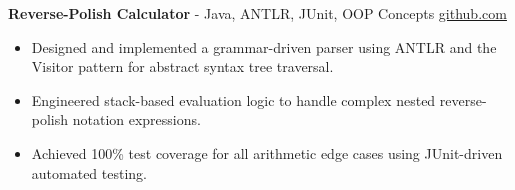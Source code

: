 \documentclass[11pt]{article}       %
\begin{document}
\textbf{Reverse-Polish Calculator}{ - Java, ANTLR, JUnit, OOP Concepts} \hfill \href{https://github.com/Monica20030707/ANTLR_ReversePolishCalculator}{github.com} \\
\vspace{-9pt}
\begin{itemize}
  \item Designed and implemented a grammar-driven parser using ANTLR and the Visitor pattern for abstract syntax tree traversal.
  \item Engineered stack-based evaluation logic to handle complex nested reverse-polish notation expressions.
  \item Achieved 100\% test coverage for all arithmetic edge cases using JUnit-driven automated testing.
\end{itemize}

\end{document}
